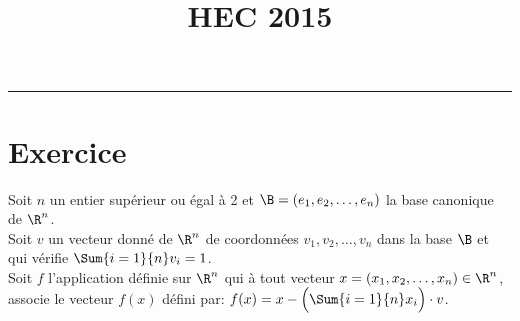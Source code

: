 \documentclass[11pt]{article}%
\title{\bf \vspace{-1.6cm} HEC 2015} %
\author{} %
\date{} %
\begin{document}
\maketitle %
\vspace{-1.2cm}\hrule %
\thispagestyle{fancy}

\vspace*{.4cm}


\section*{Exercice}

\noindent
Soit $n$ un entier supérieur ou égal à 2 et $\B=(e_1,e_2,\ldots,e_n)$
la base canonique de $\R^n$.\\
Soit $v$ un vecteur donné de $\R^n$ de coordonnées
$v_1,v_2,\ldots,v_n$ dans la base $\B$ et qui vérifie $\Sum{i=1}{n}
v_i=1$.\\[.2cm]
Soit $f$ l'application définie sur $\R^n$ qui à tout vecteur
$x=(x_1,x_2,\ldots,x_n) \in \R^n$, associe le vecteur $f(x)$ défini
par: $f(x) = x-\Big(\Sum{i=1}{n} x_i\Big) \cdot v$.
\end{document}
